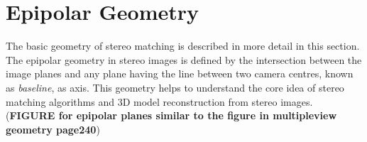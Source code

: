 \documentclass[dvips,letterpaper,12pt]{report}
\begin{document}
\section{Epipolar Geometry}
The basic geometry of stereo matching is described in more detail in this section. 
The epipolar geometry in stereo images is defined by the intersection between the image planes and any plane having the line between two camera centres, known as {\it baseline}, as axis. 
This geometry helps to understand the core idea of stereo matching algorithms and 3D model reconstruction from stereo images.
(\textbf {FIGURE  for epipolar planes similar to the figure in multipleview geometry page240})
\end{document}
